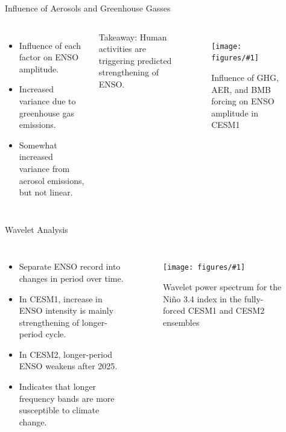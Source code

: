 \documentclass[aspectratio=1610]{beamer}
\newcommand{\myfig}[3]{
  \begin{figure}
    \centering
    \texttt{[image: figures/\#1]}
    \caption{#2}
    \label{fig:#3}
  \end{figure}
}
\begin{document}
\begin{frame}{Influence of Aerosols and Greenhouse Gasses}
  \begin{columns}
    \begin{itemize}
    \item Influence of each factor on ENSO amplitude.
    \item Increased variance due to greenhouse gas emissions.
    \item Somewhat increased variance from aerosol emissions, but not linear.
    \end{itemize}
    \alert{Takeaway:} Human activities are triggering predicted strengthening of ENSO.
    \myfig{cesm1_sf_4.pdf}{Influence of GHG, AER, and BMB forcing on ENSO amplitude in CESM1}{cesm1_sf_4}
  \end{columns}
\end{frame}


\begin{frame}{Wavelet Analysis}
  \begin{columns}
    \begin{itemize}
    \item Separate ENSO record into changes in period over time.
    \item In CESM1, increase in ENSO intensity is mainly strengthening of longer-period cycle.
    \item In CESM2, longer-period ENSO weakens after 2025.
    \item Indicates that longer frequency bands are more susceptible to climate change.
    \end{itemize}
    \myfig{wavelet3.pdf}{Wavelet power spectrum for the Niño 3.4 index in the fully-forced CESM1 and CESM2 ensembles}{wavelet2}
  \end{columns}
\end{frame}
\end{document}
